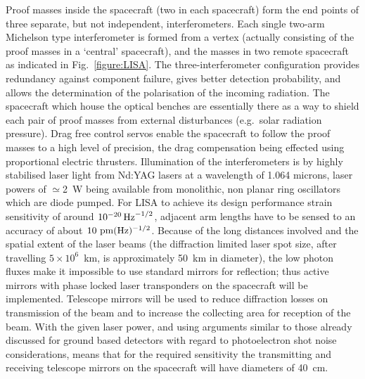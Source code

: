 \documentclass{article}
\begin{document}
Proof masses inside the spacecraft (two in each spacecraft) form the end points
of three separate, but not independent, interferometers. Each single two-arm 
Michelson type interferometer is formed from a vertex (actually consisting of
the proof masses in a `central' spacecraft), and the masses in two remote
spacecraft as indicated in Fig.~\ref{figure:LISA}. The three-interferometer
configuration provides redundancy against component failure, gives better
detection probability, and allows the determination of the polarisation of the
incoming radiation. The spacecraft which house the optical benches are
essentially there as a way to shield each pair of proof masses from external
disturbances (e.g.~solar radiation pressure). Drag free control servos enable
the spacecraft to follow the proof masses to a high level of precision, the drag
compensation being effected using proportional electric thrusters. Illumination
of the interferometers is by highly stabilised laser light from Nd:YAG lasers at
a wavelength of 1.064 microns, laser powers of $\simeq$2~W being available from
monolithic, non planar ring oscillators which are diode pumped.  For LISA to
achieve its design performance strain sensitivity of around $10^{-20}\,{\rm
Hz}^{-1/2}$, adjacent arm lengths have to be sensed to an accuracy of about $10
{\rm \ pm}(\rm Hz)^{-1/2}$. Because of the long distances involved and the
spatial extent of the laser beams (the diffraction limited laser spot size,
after travelling $5\times10^{6}$~km, is approximately 50~km in diameter), the
low photon fluxes make it impossible to use standard mirrors for reflection;
thus active mirrors with phase locked laser transponders on the spacecraft will
be implemented. Telescope mirrors will be used to reduce diffraction losses on
transmission of the beam and to increase the collecting area for reception of
the beam. With the given laser power, and using arguments similar to those
already discussed for ground based detectors with regard to photoelectron shot
noise considerations, means that for the required sensitivity the transmitting
and receiving telescope mirrors on the spacecraft will have diameters of 40~cm.

\end{document}

